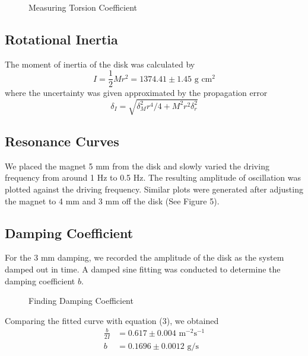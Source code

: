 \begin{figure}[h]
	\caption{Measuring Torsion Coefficient}
\end{figure}

\subsection{Rotational Inertia}
The moment of inertia of the disk was calculated by
\begin{equation}
I = \frac12Mr^2=1374.41\pm1.45\text{ g cm}^2
\end{equation}
where the uncertainty was given approximated by the propagation error
\begin{equation}
\delta_I = \sqrt{
	\delta_M^2r^4/4+M^2r^2\delta_r^2
}
\end{equation}

\subsection{Resonance Curves}
We placed the magnet 5 mm from the disk and slowly varied the driving frequency from around 1 Hz to 0.5 Hz. The resulting amplitude of oscillation was plotted against the driving frequency. Similar plots were generated after adjusting the magnet to 4 mm and 3 mm off the disk (See Figure 5).

\subsection{Damping Coefficient}
For the 3 mm damping, we recorded the amplitude of the disk as the system damped out in time. A damped sine fitting was conducted to determine the damping coefficient $b$.
\begin{figure}[h]
	\caption{Finding Damping Coefficient}
\end{figure}
Comparing the fitted curve with equation (3), we obtained
\begin{equation}
\begin{aligned}
\frac{b}{2I} &= 0.617 \pm 0.004 \text{ m}^{-2} \text{s}^{-1}\\
b &= 0.1696 \pm 0.0012 \text{ g/s}
\end{aligned}
\end{equation}

